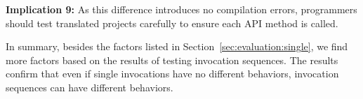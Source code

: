 \textbf{Implication 9:} As this difference introduces no compilation errors, programmers should test translated projects carefully to ensure each API method is called.

In summary, besides the factors listed in Section~\ref{sec:evaluation:single}, we find more factors based on the results of testing invocation sequences. The results confirm that even if single invocations have no different behaviors, invocation sequences can have different behaviors. 


